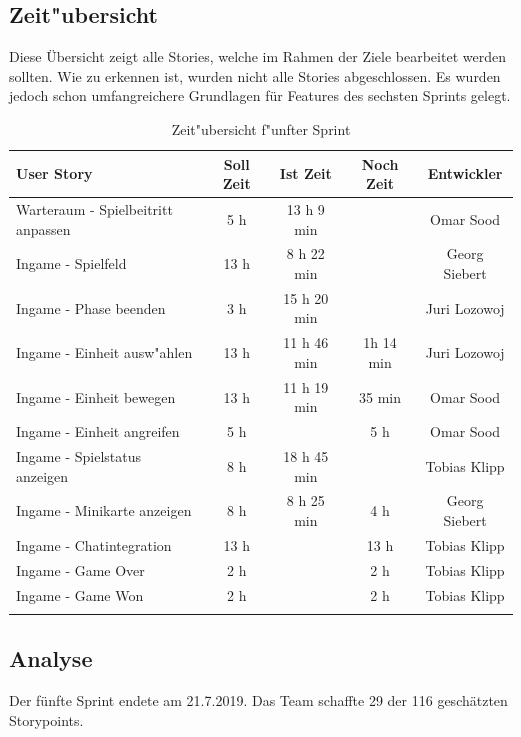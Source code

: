 \documentclass[12pt, titlepage]{scrartcl}
\begin{document}
        \subsection{Zeit"ubersicht}
        	Diese \"Ubersicht zeigt alle Stories, welche im Rahmen der Ziele bearbeitet werden sollten. Wie zu erkennen ist, wurden nicht alle Stories abgeschlossen. Es wurden jedoch schon umfangreichere Grundlagen f\"ur Features des sechsten Sprints gelegt.
        	\begin{longtable}[H]{p{6cm} c c c c }
        			\label{Time_1}
       				\textbf{User Story} & \textbf{Soll Zeit} & \textbf{Ist Zeit} & \textbf{Noch Zeit} & \textbf{Entwickler} \\
       				\toprule
       				\endhead
       				Warteraum - Spielbeitritt anpassen & 5 h & 13 h 9 min &  & Omar Sood\\
       				Ingame - Spielfeld & 13 h & 8 h 22 min &  & Georg Siebert\\
       				Ingame - Phase beenden & 3 h & 15 h 20 min &  & Juri Lozowoj \\
       				Ingame - Einheit ausw"ahlen & 13 h & 11 h 46 min & 1h 14 min & Juri Lozowoj \\
       				Ingame - Einheit bewegen & 13 h & 11 h 19 min & 35 min & Omar Sood \\
       				Ingame - Einheit angreifen & 5 h &  & 5 h & Omar Sood \\
       				Ingame - Spielstatus anzeigen & 8 h & 18 h 45 min &  & Tobias Klipp \\
       				Ingame - Minikarte anzeigen & 8 h & 8 h 25 min & 4 h & Georg Siebert \\
       				Ingame - Chatintegration & 13 h &  & 13 h & Tobias Klipp \\
       				Ingame - Game Over & 2 h &  & 2 h & Tobias Klipp \\
       				Ingame - Game Won & 2 h &  & 2 h & Tobias Klipp \\
        			\caption{Zeit"ubersicht f"unfter Sprint}
        	\end{longtable}
        \subsection{Analyse}
        	Der f\"unfte Sprint endete am 21.7.2019. Das Team schaffte 29 der 116 gesch\"atzten Storypoints.
\end{document}
